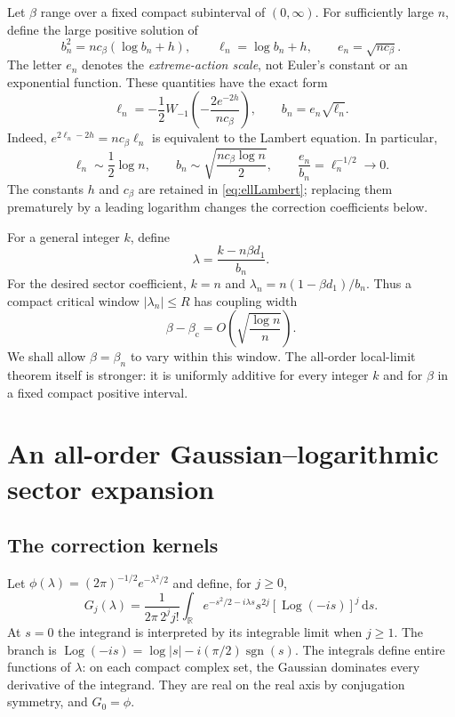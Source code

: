 \documentclass[11pt,a4paper]{article}
\numberwithin{equation}{section}
\theoremstyle{definition}
\theoremstyle{remark}
\DeclareMathOperator{\Log}{Log}
\newcommand{\R}{\mathbb R}
\newcommand{\dd}{\,\mathrm d}
\newcommand{\bc}{\beta_{\mathrm c}}
\newcommand{\ph}{\phi}
\begin{document}
Let $\beta$ range over a fixed compact subinterval of $(0,\infty)$.
For sufficiently large $n$, define the large positive solution of
\begin{equation}\label{eq:bn}
 b_n^2=n c_\beta(\log b_n+h),\qquad
 \ell_n=\log b_n+h,\qquad e_n=\sqrt{n c_\beta}.
\end{equation}
The letter $e_n$ denotes the \emph{extreme-action scale}, not Euler's
constant or an exponential function. These quantities have the exact
form
\begin{equation}\label{eq:ellLambert}
 \boxed{\quad
 \ell_n=-\frac12W_{-1}\left(-\frac{2e^{-2h}}{n c_\beta}\right),
 \qquad b_n=e_n\sqrt{\ell_n}.
 \quad}
\end{equation}
Indeed, $e^{2\ell_n-2h}=n c_\beta\ell_n$ is equivalent to the
Lambert equation. In particular,
\begin{equation}\label{eq:scalesleading}
 \ell_n\sim\frac12\log n,\qquad
 b_n\sim\sqrt{\frac{n c_\beta\log n}{2}},\qquad
 \frac{e_n}{b_n}=\ell_n^{-1/2}\longrightarrow0.
\end{equation}
The constants $h$ and $c_\beta$ are retained in \eqref{eq:ellLambert};
replacing them prematurely by a leading logarithm changes the correction
coefficients below.

For a general integer $k$, define
\begin{equation}\label{eq:lambda}
 \lambda=\frac{k-n\beta d_1}{b_n}.
\end{equation}
For the desired sector coefficient, $k=n$ and
$\lambda_n=n(1-\beta d_1)/b_n$. Thus a compact critical window
$|\lambda_n|\le R$ has coupling width
\begin{equation}\label{eq:couplingwidth}
 \beta-\bc=O\left(\sqrt{\frac{\log n}{n}}\right).
\end{equation}
We shall allow $\beta=\beta_n$ to vary within this window. The
all-order local-limit theorem itself is stronger: it is uniformly
additive for every integer $k$ and for $\beta$ in a fixed compact
positive interval.

\section{An all-order Gaussian--logarithmic sector expansion}
\label{sec:allorders}

\subsection{The correction kernels}
Let $\ph(\lambda)=(2\pi)^{-1/2}e^{-\lambda^2/2}$ and define, for
$j\ge0$,
\begin{equation}\label{eq:Gj}
 G_j(\lambda)=\frac{1}{2\pi\,2^j j!}
 \int_{\R}e^{-s^2/2-i\lambda s}s^{2j}
      [\Log(-is)]^j\dd s.
\end{equation}
At $s=0$ the integrand is interpreted by its integrable limit when
$j\ge1$. The branch is
$\Log(-is)=\log|s|-i(\pi/2)\operatorname{sgn}(s)$.
The integrals define entire functions of $\lambda$: on each compact
complex set, the Gaussian dominates every derivative of the integrand.
They are real on the real axis by conjugation symmetry, and $G_0=\ph$.
\end{document}
